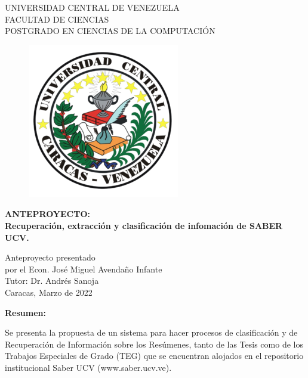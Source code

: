 
\begin{center}
	UNIVERSIDAD CENTRAL DE VENEZUELA\\
	FACULTAD DE CIENCIAS\\
	POSTGRADO EN CIENCIAS DE LA COMPUTACI\'ON\\

	\begin{figure}
						\centering
						  \includegraphics[height=.7\textwidth]{images/UCV.png}
  \end{figure}
  \vspace{1.5cm}
  \large{\textbf{ANTEPROYECTO:\\ Recuperación, extracción y clasificación de infomación de SABER UCV.}}

  \vspace{3cm}
  Anteproyecto presentado  \\
  por el Econ. José Miguel Avendaño Infante\\
  Tutor: Dr. Andrés Sanoja\\
  \vspace{1.5cm}
  Caracas, Marzo de 2022
\end{center}






\setlength{\abovedisplayskip}{-5pt}
\setlength{\abovedisplayshortskip}{-5pt}
\thispagestyle{empty}

\thispagestyle{empty}

\newpage
\thispagestyle{empty}
\large{\textbf{Resumen:}}

Se presenta la propuesta de un sistema para hacer procesos de clasificación y de Recuperación de Información sobre los Resúmenes, tanto de las Tesis como de los Trabajos Especiales de Grado (TEG) que se encuentran alojados en el repositorio institucional Saber UCV (www.saber.ucv.ve).

